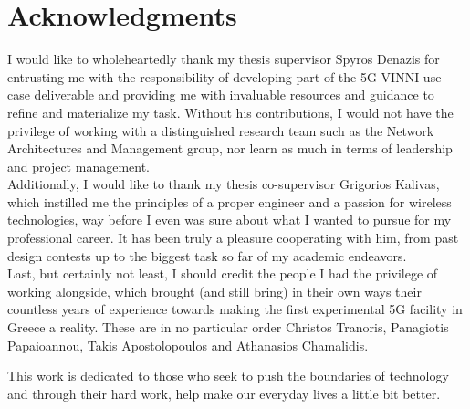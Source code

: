 % 

\cleardoublepage

\section*{Acknowledgments}

I would like to wholeheartedly thank my thesis supervisor Spyros Denazis for entrusting me with the responsibility of developing part of the 5G-VINNI use case deliverable and providing me with invaluable resources and guidance to refine and materialize my task. Without his contributions, I would not have the privilege of working with a distinguished research team such as the Network Architectures and Management group, nor learn as much in terms of leadership and project management. \\Additionally, I would like to thank my thesis co-supervisor Grigorios Kalivas, which instilled me the principles of a proper engineer and a passion for wireless technologies, way before I even was sure about what I wanted to pursue for my professional career. It has been truly a pleasure cooperating with him, from past design contests up to the biggest task so far of my academic endeavors. 
\\Last, but certainly not least, I should credit the people I had the privilege of working alongside, which brought (and still bring) in their own ways their countless years of experience towards making the first experimental 5G facility in Greece a reality. These are in no particular order Christos Tranoris, Panagiotis Papaioannou, Takis Apostolopoulos and Athanasios Chamalidis.

\begin{center}
    \thispagestyle{empty}
    \vspace*{\fill}
    This work is dedicated to those who seek to push the boundaries of technology and through their hard work, help make our everyday lives a little bit better.
    \vspace*{\fill}
\end{center}


